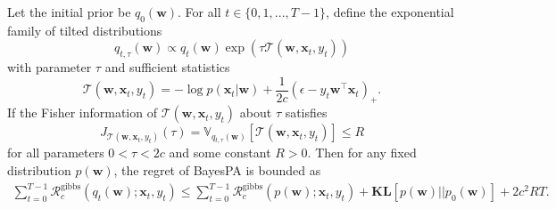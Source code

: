 \documentclass[twoside,11pt]{article}
\newcommand{\xv}{\bm{x}}
\newcommand{\regret}{\mathcal{R}}
\newcommand{\wv}{\bm{w}}
\newcommand{\KL}{\textbf{KL}}
\newcommand{\var}{\mathbb{V}}
\begin{document}
{\iffalse
\begin{theorem}\label{tm:gibbs}
Let the initial prior be $q_0(\wv)$. For all $t \in \{0,1,...,T-1\}$, define the  exponential family of tilted distributions
 \[\allowbreak q_{t, \tau}(\wv) \propto  q_{t}(\wv) \exp(\tau \mathcal{T}(\wv, \xv_t, y_t))\]
 with parameter $\tau$ and sufficient statistics
 \begin{equation*}
 \mathcal{T}(\wv, \xv_t, y_t) = -\log p(\xv_t | \wv)+\frac{1}{2c}(\epsilon-y_t \wv^\top \xv_t)_{+}.
 \end{equation*}
If the Fisher information of $\mathcal{T}(\wv, \xv_t, y_t)$ about $\tau$ satisfies
\textnormal{\begin{equation}
 J_{\mathcal{T}(\wv, \xv_t, y_t)}(\tau) = \var_{q_{t, \tau}(\wv)}\left[ \mathcal{T}(\wv, \xv_t, y_t)\right] \leq R
\end{equation}}
 for all parameters $0 < \tau < 2 c$ and some constant $R > 0$. Then for any fixed distribution $p(\wv)$, the regret of BayesPA is bounded as
\textnormal{ \setlength\arraycolsep{1pt} \begin{eqnarray} \label{eq:gibbsnlpa_bound}
\sum\limits_{t=0}^{T-1}{\regret_c^\text{gibbs}(q_t(\wv); \xv_t, y_t)} \leq \sum\limits_{t=0}^{T-1}{\regret_c^\text{gibbs}(p(\wv); \xv_t, y_t)}+\KL[p(\wv)||p_0(\wv)]+ 2 c^2 R T.  \end{eqnarray}}
\end{theorem}

}
\end{document}
